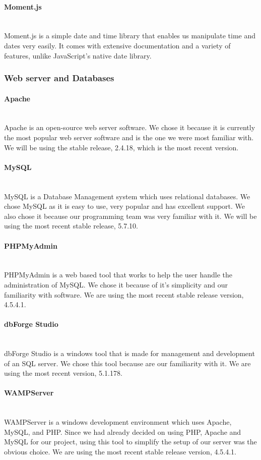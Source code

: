 \documentclass[12pt]{article}
\begin{document}
\paragraph*{Moment.js}~\\
Moment.js is a simple date and time library that enables us manipulate time and dates very easily. It comes with extensive documentation and a variety of features, unlike JavaScript's native date library.
%
%
%
\subsubsection{Web server and Databases} \label{webanddata}
\paragraph*{Apache}~\\
Apache is an open-source web server software. We chose it because it is currently the most popular web server software and is the one we were most familiar with. We will be using the stable release, 2.4.18, which is the most recent version.
%
\paragraph*{MySQL}~\\
MySQL is a Database Management system which uses relational databases. We chose MySQL as it is easy to use, very popular and has excellent support. We also chose it because our programming team was very familiar with it. We will be using the most recent stable release, 5.7.10.
%
\paragraph*{PHPMyAdmin}~\\
PHPMyAdmin is a web based tool that works to help the user handle the administration of MySQL. We chose it because of it's simplicity and our familiarity with software. We are using the most recent stable release version, 4.5.4.1.
%
\paragraph*{dbForge Studio}~\\
dbForge Studio is a windows tool that is made for management and development of an SQL server. We chose this tool because are our familiarity with it. We are using the most recent version, 5.1.178.
%
\paragraph*{WAMPServer}~\\
WAMPServer is a windows development environment which uses Apache, MySQL, and PHP. Since we had already decided on using PHP, Apache and MySQL for our project, using this tool to simplify the setup of our server was the obvious choice. We are using the most recent stable release version, 4.5.4.1.
%
\end{document}

